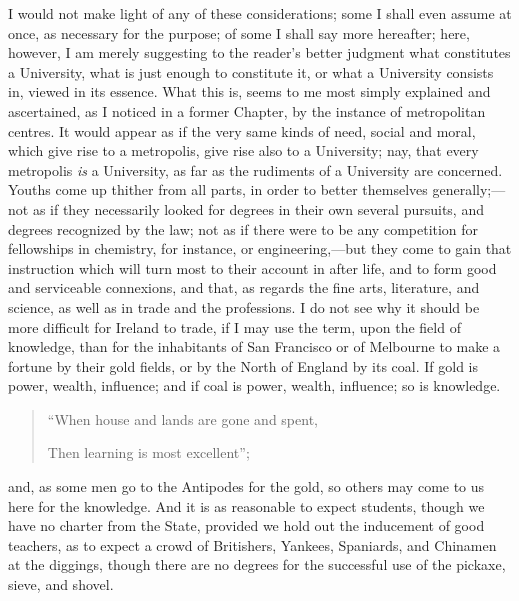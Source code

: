 I would not make light of any of these considerations; some I shall
even assume at once, as necessary for the purpose; of some I shall say
more hereafter; here, however, I am merely suggesting to the
reader's better judgment what constitutes a University, what is just
enough to constitute it, or what a University consists in, viewed in
its essence. What this is, seems to me most simply explained and
ascertained, as I noticed in a former Chapter, by the instance of
metropolitan centres. It would appear as if the very same kinds of
need, social and moral, which give rise to a metropolis, give rise
also to a University; nay, that every metropolis \emph{is} a
University, as far as the rudiments of a University are concerned.
Youths come up thither from all parts, in order to better themselves
generally;—not as if they necessarily looked for degrees in their
own several pursuits, and degrees recognized by the law; not as if
there were to be any competition for fellowships in chemistry, for
instance, or engineering,—but they come to gain that instruction
which will turn most to their account in after life, and to form good
and serviceable connexions, and that, as regards the fine arts,
literature, and science, as well as in trade and the professions. I do
not see why it should be more difficult for Ireland to trade, if I may
use the term, upon the field of knowledge, than for the inhabitants of
San Francisco or of Melbourne to make a fortune by their gold fields,
or by the North of England by its coal. If gold is power, wealth,
influence; and if coal is power, wealth, influence; so is knowledge.

\begin{quote}

``When house and lands are gone and spent,

Then learning is most excellent'';

\end{quote}

and, as some men go to the Antipodes for the gold, so others may
come to us here for the knowledge. And it is as reasonable to expect
students, though we have no charter from the State, provided we hold
out the inducement of good teachers, as to expect a crowd of
Britishers, Yankees, Spaniards, and Chinamen at the diggings, though
there are no degrees for the successful use of the pickaxe, sieve, and
shovel.

